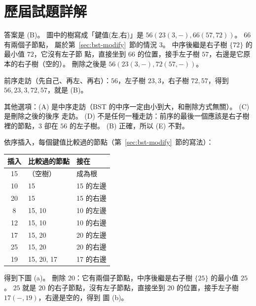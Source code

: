 \section*{歷屆試題詳解}

答案是 (B)。 圖中的樹寫成「鍵值(左,右)」是 $56(23(3,-),66(57,72))$。 $66$ 有兩個子節點，
屬於第~\ref{sec:bst-modify}~節的情況 3。 中序後繼是右子樹 $\{72\}$ 的最小值 $72$，它沒有左子節
點，直接坐到 $66$ 的位置，接手左子樹 $57$，右邊是它原本的右子樹（空的）。 刪除之後是
$56(23(3,-),72(57,-))$。

前序走訪（先自己、再左、再右）：$56$，左子樹 $23, 3$，右子樹 $72, 57$，得到
$56, 23, 3, 72, 57$，就是 (B)。

其他選項：(A) 是中序走訪（BST 的中序一定由小到大，和刪除方式無關）。 (C) 是刪除之後的後序
走訪。 (D) 不是任何一種走訪：前序的最後一個應該是右子樹裡的節點，$3$ 卻在 $56$ 的左子樹。
(B) 正確，所以 (E) 不對。

依序插入，每個鍵值比較過的節點（第~\ref{sec:bst-modify}~節的寫法）：

\begin{center}
\begin{tabular}{cll}
\toprule
插入 & 比較過的節點 & 接在 \\
\midrule
15 & （空樹） & 成為根 \\
10 & 15 & 15 的左邊 \\
20 & 15 & 15 的右邊 \\
8 & 15, 10 & 10 的左邊 \\
12 & 15, 10 & 10 的右邊 \\
17 & 15, 20 & 20 的左邊 \\
25 & 15, 20 & 20 的右邊 \\
19 & 15, 20, 17 & 17 的右邊 \\
\bottomrule
\end{tabular}
\end{center}

得到下圖 (a)。 刪除 $20$：它有兩個子節點，中序後繼是右子樹 $\{25\}$ 的最小值 $25$。 $25$ 就是
$20$ 的右子節點，沒有左子節點，直接坐到 $20$ 的位置，接手左子樹 $17(-,19)$，右邊是空的，得到
圖 (b)。

